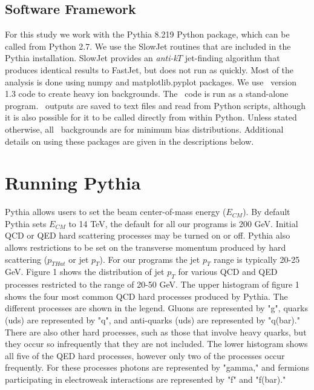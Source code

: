 \documentclass[11pt]{article}
\begin{document}
\subsection*{Software Framework}

For this study we work with the Pythia 8.219 Python package, which can be called from Python 2.7.  We use the SlowJet routines that are included in the Pythia installation.  SlowJet provides an {\it anti-k$T$} jet-finding algorithm that produces identical results to FastJet, but does not run as quickly.  Most of the analysis is done using numpy and matplotlib.pyplot packages.  We use \trento\ version 1.3 code to create heavy ion backgrounds. The \trento\ code is run as a stand-alone program.  \trento\ outputs are saved to text files and read from Python scripts, although it is also possible for it to be called directly from within Python.  Unless stated otherwise, all \trento\ backgrounds are for minimum bias distributions.  Additional details on using these packages are given in the descriptions below.

\section{Running Pythia}
%
%
Pythia allows users to set the beam center-of-mass energy ($E_{CM}$). By default Pythia sets $E_{CM}$ to 14 TeV, the default for all our programs is 200 GeV.  Initial QCD or QED hard scattering processes may be turned on or off. Pythia also allows restrictions to be set on the transverse momentum produced by hard scattering ($p_{THat}$ or jet $p_T$). For our programs the jet $p_T$ range is typically 20-25 GeV. Figure 1 shows the distribution of jet $p_T$ for various QCD and QED processes restricted to the range of 20-50 GeV. The upper histogram of figure 1 shows the four most common QCD hard processes produced by Pythia. The different processes are shown in the legend. Gluons are represented by "g", quarks (uds) are represented by "q", and anti-quarks (uds) are represented by "q(bar)." There are also other hard processes, such as those that involve heavy quarks, but they occur so infrequently that they are not included. The lower histogram shows all five of the QED hard processes, however only two of the processes occur frequently. For these processes photons are represented by "gamma," and fermions participating in electroweak interactions are represented by "f" and "f(bar)."
\end{document}
